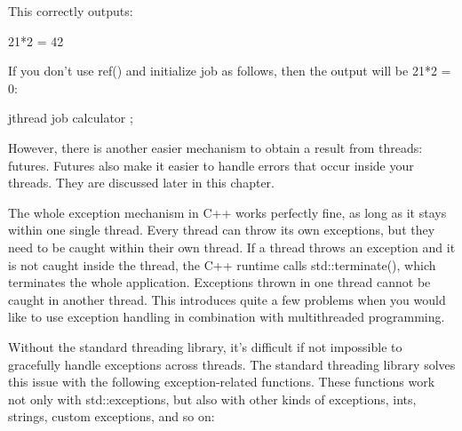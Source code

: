 This correctly outputs:

\begin{shell}
21*2 = 42
\end{shell}

If you don’t use ref() and initialize job as follows, then the output will be 21*2 = 0:

\begin{cpp}
jthread job { calculator };
\end{cpp}

However, there is another easier mechanism to obtain a result from threads: futures. Futures also make it easier to handle errors that occur inside your threads. They are discussed later in this chapter.


The whole exception mechanism in C++ works perfectly fine, as long as it stays within one single thread. Every thread can throw its own exceptions, but they need to be caught within their own thread. If a thread throws an exception and it is not caught inside the thread, the C++ runtime calls std::terminate(), which terminates the whole application. Exceptions thrown in one thread cannot be caught in another thread. This introduces quite a few problems when you would like to use exception handling in combination with multithreaded programming.

Without the standard threading library, it’s difficult if not impossible to gracefully handle exceptions across threads. The standard threading library solves this issue with the following exception-related functions. These functions work not only with std::exceptions, but also with other kinds of exceptions, ints, strings, custom exceptions, and so on:

